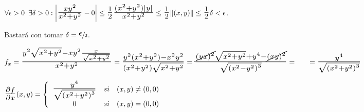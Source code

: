 \documentclass[12pt, titlepage]{article}
\newcommand{\bfrac}[2]{\scalebox{1.4}{$\frac{#1}{#2}$}}
\newcommand{\spac}{\, \, \,}
\begin{document}
$\forall \epsilon >0 \spac \exists \delta > 0 : \left | \bfrac{xy^2}{x^2 + y^2} - 0 \right | \leq \bfrac{1}{2} 
\bfrac{(x^2 + y^2) |y|}{x^2 + y^2} \leq \bfrac{1}{2} \|(x, y)\| \leq \bfrac{1}{2} \delta < \epsilon$. \\
\vspace{3mm}

Bastará con tomar $\delta = \sfrac{\scalebox{1.5}{$\epsilon$}}{2}$.
\vspace{5mm}

$f_x = \bfrac{y^2 \sqrt{x^2 + y^2} - xy^2 \frac{x}{\sqrt{x^2 + y^2}}}{x^2 + y^2} = \bfrac{y^2 (x^2 
+ y^2) - x^2y^2}{(x^2 + y^2) \sqrt{x^2 + y^2}} = \bfrac{\cancel{{(yx)}^2} \sqrt{x^2 + y^2} + 
y^4 - \cancel{{(xy)^2}}}{\sqrt{{(x^2 - y^2)}^3}} = \\ \indent = \bfrac{y^4}{\sqrt{{(x^2 + y^2)}^3}}$
\vspace{3mm}

$\bfrac{\partial f}{\partial x} (x, y) = \left \{
\begin{array}{ccc}

\bfrac{y^4}{\sqrt{{(x^2 + y^2)}^3}} & si & (x, y) \neq (0, 0)\\
0 & si & (x, y) = (0, 0)\\

\end{array}\right .
$
\end{document}
